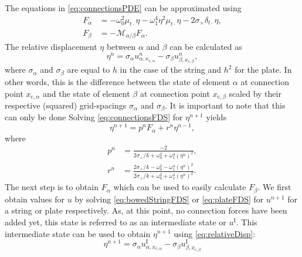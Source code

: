 \documentclass{article}
\begin{document}
The equations in \eqref{eq:connectionsPDE} can be approximated using \cite{Bilbao2009:ModularPercussion}
\begin{subequations}
\begin{align}\label{eq:connectionsFDS}
    F_\alpha &= -\omega_0^2\mu_{t\cdot}\eta - \omega_1^4\eta^2\mu_{t\cdot}\eta - 2\sigma_\times\delta_{t\cdot}\eta,\\
    F_\beta &= -\mathcal{M}_{\alpha/\beta}F_\alpha.
\end{align}
\end{subequations}
The relative displacement $\eta$ between $\alpha$ and $\beta$ can be calculated as
\begin{equation}\label{eq:relativeDisp}
    \eta^n = \sigma_\alpha u_{\alpha, x_{\text{c},\alpha}}^n - \sigma_\beta u_{\beta,x_{\text{c},\beta}}^n,
\end{equation}
where $\sigma_\alpha$ and $\sigma_\beta$ are equal to $h$ in the case of the string and $h^2$ for the plate. In other words, this is the difference between the state of element $\alpha$ at connection point $x_{\text{c},\alpha}$ and the state of element $\beta$ at connection point $x_{\text{c},\beta}$ scaled by their respective (squared) grid-spacings $\sigma_\alpha$ and $\sigma_\beta$. It is important to note that this can only be done Solving \eqref{eq:connectionsFDS} for $\eta^{n+1}$ yields
\begin{equation} \label{eq:etaNext}
    \eta^{n+1} = p^nF_\alpha+r^n\eta^{n-1},
\end{equation}
where
\begin{subequations}
\begin{align}
    p^n &= \frac{-2}{2\sigma_\times / k + \omega_0^2 + \omega_1^4(\eta^n)^2},\\
    r^n &= \frac{2\sigma_\times / k - \omega_0^2 -\omega_1^4(\eta^n)^2}{2\sigma_\times / k + \omega_0^2 + \omega_1^4(\eta^n)^2}.
\end{align}
\end{subequations}
The next step is to obtain $F_\alpha$ which can be used to easily calculate $F_\beta$. We first obtain values for $u$ by solving \eqref{eq:bowedStringFDS} or \eqref{eq:plateFDS} for $u^{n+1}$ for a string or plate respectively. As, at this point, no connection forces have been added yet, this state is referred to as an intermediate state or $u^\text{I}$. This intermediate state can be used to obtain $\eta^{n+1}$ using \eqref{eq:relativeDisp}:
\begin{equation}
    \eta^{n+1} = \sigma_\alpha u_{\alpha,x_{\text{c},\alpha}}^\text{I} - \sigma_\beta u_{\beta,x_{\text{c},\beta}}^\text{I}
\end{equation}
\end{document}
